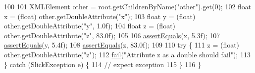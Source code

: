 \begin{DoxyCode}
100         
101         XMLElement other = root.getChildrenByName(\textcolor{stringliteral}{"other"}).get(0);
102         \textcolor{keywordtype}{float} x = (float) other.getDoubleAttribute(\textcolor{stringliteral}{"x"});
103         \textcolor{keywordtype}{float} y = (float) other.getDoubleAttribute(\textcolor{stringliteral}{"y"}, 1.0f);
104         \textcolor{keywordtype}{float} z = (float) other.getDoubleAttribute(\textcolor{stringliteral}{"z"}, 83.0f);
105         
106         \mbox{\hyperlink{classorg_1_1newdawn_1_1slick_1_1tests_1_1xml_1_1_x_m_l_test_adbfd9cbd27f7f0377c936ef816a067ac}{assertEquals}}(x, 5.3f);
107         \mbox{\hyperlink{classorg_1_1newdawn_1_1slick_1_1tests_1_1xml_1_1_x_m_l_test_adbfd9cbd27f7f0377c936ef816a067ac}{assertEquals}}(y, 5.4f);
108         \mbox{\hyperlink{classorg_1_1newdawn_1_1slick_1_1tests_1_1xml_1_1_x_m_l_test_adbfd9cbd27f7f0377c936ef816a067ac}{assertEquals}}(z, 83.0f);
109         
110         \textcolor{keywordflow}{try} \{
111             z = (float) other.getDoubleAttribute(\textcolor{stringliteral}{"z"});
112             \mbox{\hyperlink{classorg_1_1newdawn_1_1slick_1_1tests_1_1xml_1_1_x_m_l_test_a2ebb5c21c202786fb9222bee867ae91c}{fail}}(\textcolor{stringliteral}{"Attribute z as a double should fail"});
113         \} \textcolor{keywordflow}{catch} (SlickException e) \{
114             \textcolor{comment}{// expect exception}
115         \}
116     \}
\end{DoxyCode}
